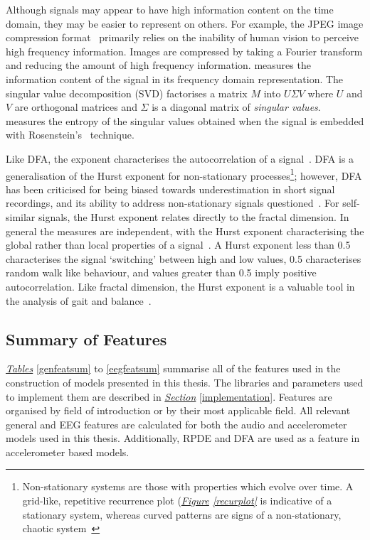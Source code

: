 \documentclass[12pt, twoside]{book}
\renewcommand\emph[1]{\textit{\color{USred}{#1}}}
\begin{document}
Although signals may appear to have high information content on the time domain, they may be easier to represent on others. For example, the JPEG image compression format~\cite{jpeg} primarily relies on the inability of human vision to perceive high frequency information. Images are compressed by taking a Fourier transform and reducing the amount of high frequency information. \emph{Spectral entropy} measures the information content of the signal in its frequency domain representation. The singular value decomposition (SVD) factorises a matrix $M$ into $U\Sigma V$ where $U$ and $V$ are orthogonal matrices and $\Sigma$ is a diagonal matrix of \textit{singular values}.  \emph{SVD entropy}~\cite{svdentropy} measures the entropy of the singular values obtained when the signal is embedded with Rosenstein's~\cite{rosenstein1993practicallyapunov} technique. 

Like DFA, the \emph{Hurst} exponent characterises the autocorrelation of a signal~\cite{hurst}. DFA is a generalisation of the Hurst exponent for non-stationary processes\footnote{Non-stationary systems are those with properties which evolve over time. A grid-like, repetitive recurrence plot (\textit{\hyperref[recurplot]{Figure} \ref{recurplot}} is indicative of a stationary system, whereas curved patterns are signs of a non-stationary, chaotic system~\cite{facchini2005recurrence}}; however, DFA has been criticised for being biased towards underestimation in short signal recordings, and its ability to address non-stationary signals questioned~\cite{revistDFA}. For self-similar signals, the Hurst exponent relates directly to the fractal dimension. In general the measures are independent, with the Hurst exponent characterising the global rather than local properties of a signal~\cite{hurstfractal}. A Hurst exponent less than 0.5 characterises the signal `switching' between high and low values, 0.5 characterises random walk like behaviour, and values greater than 0.5 imply positive autocorrelation. Like fractal dimension, the Hurst exponent is a valuable tool in the analysis of gait and balance~\cite{duarte2000fractal}. 

\vspace{22em}
\subsection{Summary of Features}
\textit{\hyperref[genfeatsum]{Tables}} \ref{genfeatsum} to \ref{eegfeatsum} summarise all of the features used in the construction of models presented in this thesis. The libraries and parameters used to implement them are described in \textit{\hyperref[implementation]{Section}} \ref{implementation}. Features are organised by field of introduction or by their most applicable field. All relevant general and EEG features are calculated for both the audio and accelerometer models used in this thesis. Additionally, RPDE and DFA are used as a feature in accelerometer based models.
\end{document}
